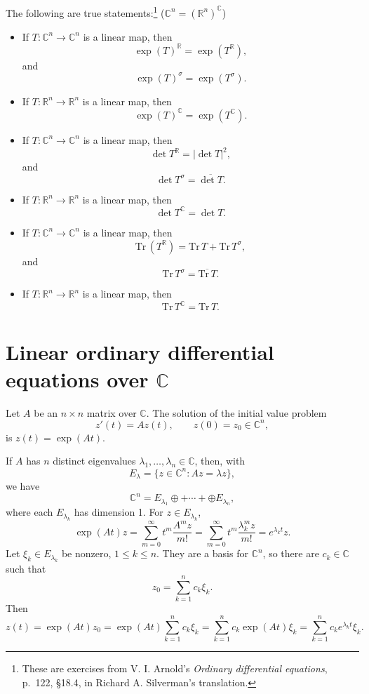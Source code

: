 \documentclass{article}
\newcommand{\Tr}{\textrm{Tr}\,}
\begin{document}
The following are true statements:\footnote{These are exercises from V. I. Arnold's {\em Ordinary differential equations},
p.~122, \S 18.4, in Richard A. Silverman's translation.} ($\mathbb{C}^n=(\mathbb{R}^n)^\mathbb{C}$)

\begin{itemize}
\item If $T:\mathbb{C}^n \to \mathbb{C}^n$ is a linear map, then
\[
\exp(T)^\mathbb{R}=\exp(T^\mathbb{R}),
\]
and 
\[
\exp(T)^\sigma=\exp(T^\sigma).
\]
\item If $T:\mathbb{R}^n \to \mathbb{R}^n$ is a linear map, then
\[
\exp(T)^\mathbb{C}=\exp(T^\mathbb{C}).
\]
\item If $T:\mathbb{C}^n \to \mathbb{C}^n$ is a linear map, then
\[
\det T^\mathbb{R}=|\det T|^2,
\]
and 
\[
\det T^\sigma=\overline{\det T}.
\]
\item If $T:\mathbb{R}^n \to \mathbb{R}^n$ is a linear map, then
\[
\det T^\mathbb{C}=\det T.
\]
\item If $T:\mathbb{C}^n \to \mathbb{C}^n$ is a linear map, then
\[
\Tr (T^\mathbb{R})=\Tr T+\Tr T^\sigma,
\]
and 
\[
\Tr T^\sigma=\overline{\Tr T}.
\]
\item If $T:\mathbb{R}^n \to \mathbb{R}^n$ is a linear map, then
\[
\Tr T^\mathbb{C}=\Tr T.
\]
\end{itemize}


\section{Linear ordinary differential equations over $\mathbb{C}$}
Let $A$ be an $n \times n$ matrix over $\mathbb{C}$. The solution of the initial value problem
\[
z'(t)=Az(t), \qquad z(0)=z_0 \in \mathbb{C}^n,
\]
is $z(t)=\exp(At)$. 

If $A$ has $n$ distinct eigenvalues $\lambda_1,\ldots,\lambda_n \in \mathbb{C}$, then, with
\[
E_\lambda=\{z \in \mathbb{C}^n: Az=\lambda z\},
\]
 we have
\[
\mathbb{C}^n = E_{\lambda_1} \oplus + \cdots + \oplus E_{\lambda_n},
\]
where each $E_{\lambda_k}$ has dimension 1. For $z \in E_{\lambda_k}$, 
\[
\exp(At)z=\sum_{m=0}^\infty t^m \frac{A^m z}{m!} = \sum_{m=0}^\infty t^m \frac{\lambda_k^m z}{m!}=e^{\lambda_k t}z.
\]
Let $\xi_k \in E_{\lambda_k}$ be nonzero, $1 \leq k \leq n$. They are a basis for $\mathbb{C}^n$, so there are $c_k \in \mathbb{C}$ such that
\[
z_0=\sum_{k=1}^n c_k \xi_k.
\]
Then
\[
z(t)=\exp(At)z_0=\exp(At)\sum_{k=1}^n c_k \xi_k=\sum_{k=1}^n c_k \exp(At) \xi_k=
\sum_{k=1}^n c_k e^{\lambda_k t} \xi_k.
\]
\end{document}
